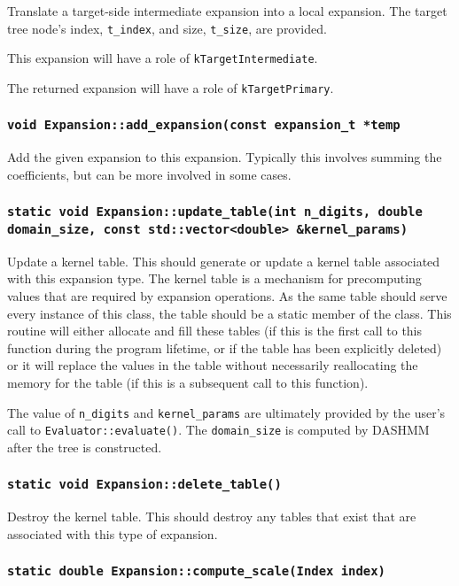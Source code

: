 Translate a target-side intermediate expansion into a local expansion. The
target tree node's index, \texttt{t\_index}, and size, \texttt{t\_size},
are provided.

This expansion will have a role of \texttt{kTargetIntermediate}.

The returned expansion will have a role of \texttt{kTargetPrimary}.

\subsubsection{\texttt{void Expansion::add\_expansion(const expansion\_t *temp}}

Add the given expansion to this expansion. Typically this involves summing the
coefficients, but can be more involved in some cases.

\subsubsection{\texttt{static void Expansion::update\_table(int n\_digits, double domain\_size, const std::vector<double> \&kernel\_params)}}

Update a kernel table. This should generate or update a kernel table associated
with this expansion type. The kernel table is a mechanism for precomputing
values that are required by expansion operations. As the same table should
serve every instance of this class, the table should be a static member of the
class. This routine will either allocate and fill these tables (if this is the
first call to this function during the program lifetime, or if the table has
been explicitly deleted) or it will replace the values in the table without
necessarily reallocating the memory for the table (if this is a subsequent call
to this function).

The value of \texttt{n\_digits} and \texttt{kernel\_params} are ultimately
provided by the user's call to \texttt{Evaluator::evaluate()}. The
\texttt{domain\_size} is computed by DASHMM after the tree is constructed.

\subsubsection{\texttt{static void Expansion::delete\_table()}}

Destroy the kernel table. This should destroy any tables that exist that are
associated with this type of expansion.

\subsubsection{\texttt{static double Expansion::compute\_scale(Index index)}}

